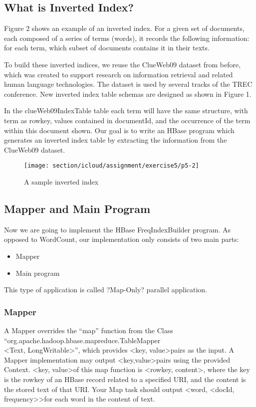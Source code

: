 \subsection*{What is Inverted Index?}
Figure 2 shows an example of an inverted index. For a given set of documents,
each composed of a series of terms (words), it records the following
information: for each term, which subset of documents contains it in their
texts.

To build these inverted indices, we reuse the ClueWeb09 dataset from before,
which was created to support research on information retrieval and related
human language technologies. The dataset is used by several tracks of the TREC
conference. New inverted index table schemas are designed as shown in Figure 1.

In the clueWeb09IndexTable table each term will have the same structure, with
term as rowkey, values contained in documentId, and the occurrence of the term
within this document shown. Our goal is to write an HBase program which
generates an inverted index table by extracting the information from the
ClueWeb09 dataset.

\begin{figure}[!htbp]
\texttt{[image: section/icloud/assignment/exercise5/p5-2]}
\centering
\caption{A sample inverted index}
\end{figure}

\subsection*{Mapper and Main Program}
Now we are going to implement the HBase FreqIndexBuilder program. As opposed to
WordCount, our implementation only consists of two main parts:

\begin{itemize}
\item Mapper
\item Main program
\end{itemize}
This type of application is called ?Map-Only? parallel application.

\subsubsection*{Mapper}
A Mapper overrides the ``map'' function from the Class ``org.apache.hadoop.hbase.mapreduce.TableMapper\\
\textless Text, LongWritable\textgreater'', which provides \textless key, value\textgreater pairs as the input. A Mapper implementation may output \textless key,value\textgreater pairs using the provided Context.
\textless key, value\textgreater of this map function is \textless rowkey, content\textgreater, where the key is the rowkey of an HBase record related to a specified URI, and the content is the stored text of that URI. Your Map task should output \textless word, \textless docId, frequency\textgreater\textgreater for each word in the content of text.

